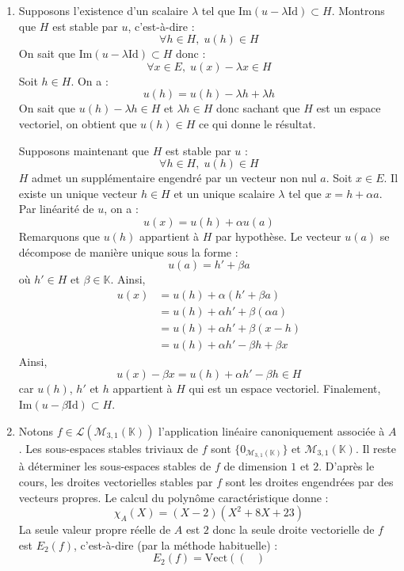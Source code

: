 \documentclass[a4paper,10pt]{report}
\begin{document}
\corr \begin{enumerate}
\item Supposons l'existence d'un scalaire $\lambda$ tel que $\textrm{Im}(u- \lambda \textrm{Id}) \subset H$. Montrons que $H$ est stable par $u$, c'est-à-dire :
$$ \forall h \in H, \; u(h) \in H$$
On sait que $\textrm{Im}(u- \lambda \textrm{Id}) \subset H$ donc :
$$ \forall x \in E, \; u(x)- \lambda x \in H$$
Soit $h \in H$. On a :
$$ u(h) = u(h)- \lambda h + \lambda h$$
On sait que $u(h) - \lambda h \in H$ et $\lambda h \in H$ donc sachant que $H$ est un espace vectoriel, on obtient que $u(h) \in H$ ce qui donne le résultat.

\medskip

\noindent Supposons maintenant que $H$ est stable par $u$ :
$$ \forall h \in H, \; u(h) \in H$$
$H$ admet un supplémentaire engendré par un vecteur non nul $a$. Soit $x \in E$. Il existe un unique vecteur $h \in H$ et un unique scalaire $\lambda$ tel que $x=h + \alpha a$. Par linéarité de $u$, on a :
$$ u(x) = u(h) + \alpha u(a)$$
Remarquons que $u(h)$ appartient à $H$ par hypothèse. Le vecteur $u(a)$ se décompose de manière unique sous la forme :
$$ u(a) = h' + \beta  a$$
où $h' \in H$ et $\beta \in \mathbb{K}$. Ainsi,
\begin{align*}
u(x) & = u(h)+ \alpha (h'+ \beta a) \\
& = u(h) + \alpha h' + \beta (\alpha a) \\
& = u(h) + \alpha h' + \beta(x-h) \\
& = u(h)+ \alpha h' - \beta h + \beta x
\end{align*}
Ainsi,
$$ u(x)- \beta x = u(h)+ \alpha h' - \beta h \in H$$
car $u(h)$, $h'$ et $h$ appartient à $H$ qui est un espace vectoriel. Finalement, $\textrm{Im}(u- \beta \textrm{Id}) \subset H$.
\item Notons $f \in \mathcal{L}(\mathcal{M}_{3,1}(\mathbb{K}))$ l'application linéaire canoniquement associée à $A$. Les sous-espaces stables triviaux de $f$ sont $\lbrace 0_{\mathcal{M}_{3,1}(\mathbb{K})} \rbrace$ et $\mathcal{M}_{3,1}(\mathbb{K})$. Il reste à déterminer les sous-espaces stables de $f$ de dimension $1$ et $2$. D'après le cours, les droites vectorielles stables par $f$ sont les droites engendrées par des vecteurs propres. Le calcul du polynôme caractéristique donne :
$$ \chi_A(X) = (X-2)(X^2+8X+23)$$
La seule valeur propre réelle de $A$ est $2$ donc la seule droite vectorielle de $f$ est $E_2(f)$, c'est-à-dire (par la méthode habituelle) :
$$ E_2(f) = \textrm{Vect} \left( \begin{pmatrix}

\end{pmatrix}$$
\end{enumerate}
\end{document}
